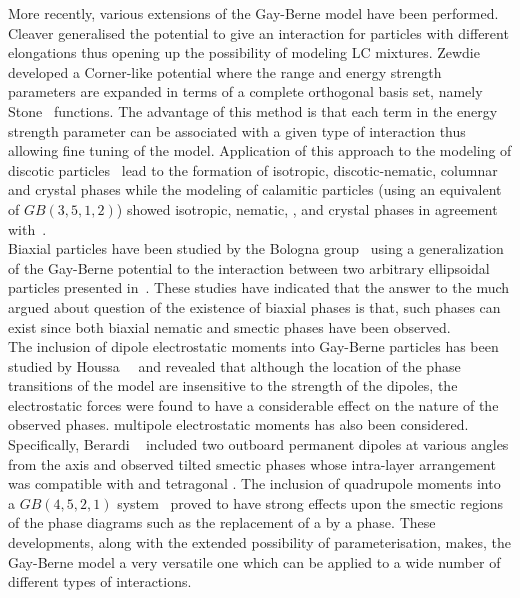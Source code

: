 More recently, various extensions of the Gay-Berne model have been performed. 
Cleaver \etal\cite{CleaverCare96} generalised the potential to give an interaction for particles 
with different elongations thus opening up the possibility of modeling LC mixtures.
Zewdie~\cite{Zewdie98a,Zewdie98b} developed a Corner-like potential where the range and
energy strength parameters are expanded in terms of a complete orthogonal basis set, namely
Stone~\cite{Stone} functions. The advantage of this method is that each term in the energy
strength parameter can be associated with a given type of interaction thus allowing fine tuning
of the model. Application of this approach to the modeling of discotic particles~\cite{Zewdie98a} 
lead to the
formation of isotropic, discotic-nematic, columnar and crystal phases while the modeling of
calamitic particles (using an equivalent of $GB(3,5,1,2)$) showed isotropic, nematic, \smA, \smB and
crystal phases in agreement with~\cite{AdamLuckhurst87}.\\
%
Biaxial particles have been studied by the Bologna 
group~\cite{BerardiZannoni00,Zannoni02} using a generalization of the Gay-Berne
potential to the interaction between two arbitrary ellipsoidal particles presented
in~\cite{BerardiFava98}. These studies have indicated that the answer to the much argued about 
question
of the existence of biaxial phases is that, such phases can exist since both biaxial nematic and
smectic phases have been observed.\\
%
The inclusion of dipole electrostatic moments into Gay-Berne particles has been studied by
Houssa~\etal~\cite{HoussaRull98, HoussaMcGrother99} and revealed that although the location of
the phase transitions of the model are insensitive to the strength of the dipoles, the
electrostatic forces were found to have a considerable effect on the nature of the observed
phases.
multipole electrostatic moments has also been considered. Specifically, 
Berardi \etal~\cite{BerardiOrlandi03} included two outboard permanent dipoles at various angles
from the axis and observed tilted smectic phases whose intra-layer arrangement was compatible
with \smJ and tetragonal \smT. The inclusion of quadrupole moments into a $GB(4,5,2,1)$
system~\cite{Withers} proved to have strong effects upon the smectic regions of the phase
diagrams such as the replacement of a \smB by a \smJ phase.
%
These developments, along with the
extended possibility of parameterisation, makes, the Gay-Berne model a very versatile one which can
be applied to a wide number of different types of interactions. 



